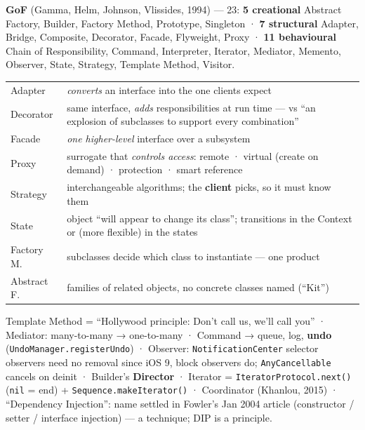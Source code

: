 \documentclass[8pt]{extarticle}
\newcommand\ct[1]{\texttt{#1}}
\newcommand\hd[1]{\par\vspace{3pt}\noindent{\small\bfseries\color{sheetBlue}#1}\par\vspace{1pt}}
\begin{document}
\begin{multicols}{2}
\hd{Patterns \& principles — the authors' words}
{\scriptsize \textbf{GoF} (Gamma, Helm, Johnson, Vlissides, 1994) — 23: \textbf{5 creational} Abstract
Factory, Builder, Factory Method, Prototype, Singleton · \textbf{7 structural} Adapter, Bridge,
Composite, Decorator, Facade, Flyweight, Proxy · \textbf{11 behavioural} Chain of Responsibility,
Command, Interpreter, Iterator, Mediator, Memento, Observer, State, Strategy, Template Method,
Visitor.\par}
{\scriptsize\setlength{\tabcolsep}{2pt}
\begin{tabular}{@{}L{12mm}L{66mm}@{}}
\toprule
Adapter & \emph{converts} an interface into the one clients expect\\
Decorator & same interface, \emph{adds} responsibilities at run time — vs ``an explosion of subclasses to support every combination''\\
Facade & \emph{one higher-level} interface over a subsystem\\
Proxy & surrogate that \emph{controls access}: remote · virtual (create on demand) · protection · smart reference\\
\midrule
Strategy & interchangeable algorithms; the \textbf{client} picks, so it must know them\\
State & object ``will appear to change its class''; transitions in the Context or (more flexible) in the states\\
\midrule
Factory M. & subclasses decide which class to instantiate — one product\\
Abstract F. & families of related objects, no concrete classes named (``Kit'')\\
\bottomrule
\end{tabular}}
{\scriptsize Template Method = ``Hollywood principle: Don't call us, we'll call you'' · Mediator:
many-to-many → one-to-many · Command → queue, log, \textbf{undo} (\ct{UndoManager.registerUndo}) ·
Observer: \ct{NotificationCenter} selector observers need no removal since iOS 9, block observers do;
\ct{AnyCancellable} cancels on deinit · Builder's \textbf{Director} · Iterator =
\ct{IteratorProtocol.next()} (\ct{nil} = end) + \ct{Sequence.makeIterator()} · Coordinator
(Khanlou, 2015) · ``Dependency Injection'': name settled in Fowler's Jan 2004 article (constructor /
setter / interface injection) — a technique; DIP is a principle.\par}

\end{multicols}

\end{document}
